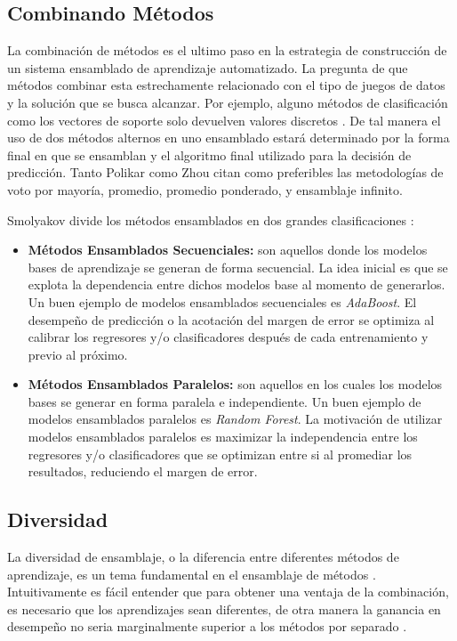 \subsection{Combinando Métodos}
La combinación de métodos es el ultimo paso en la estrategia de construcción de un sistema ensamblado de aprendizaje automatizado. La pregunta de que métodos combinar esta estrechamente relacionado con el tipo de juegos de datos y la solución que se busca alcanzar. Por ejemplo, alguno métodos de clasificación como los vectores de soporte solo devuelven valores discretos \cite{ensembleMachineLearning}. De tal manera el uso de dos métodos alternos en uno ensamblado estará determinado por la forma final en que se ensamblan y el algoritmo final utilizado para la decisión de predicción. Tanto Polikar \cite{ensembleMachineLearning} como Zhou \cite{ensembleMethods} citan como preferibles las metodologías de voto por mayoría, promedio, promedio ponderado, y ensamblaje infinito.

Smolyakov divide los métodos ensamblados en dos grandes clasificaciones \cite{smolyakov}:

\begin{itemize}
  \item \textbf{Métodos Ensamblados Secuenciales:} son aquellos donde los modelos bases de aprendizaje se generan de forma secuencial. La idea inicial es que se explota la dependencia entre dichos modelos base al momento de generarlos. Un buen ejemplo de modelos ensamblados secuenciales es \emph{AdaBoost}. El desempeño de predicción o la acotación del margen de error se optimiza al calibrar los regresores y/o clasificadores después de cada entrenamiento y previo al próximo.
  \item \textbf{Métodos Ensamblados Paralelos:} son aquellos en los cuales los modelos bases se generar en forma paralela e independiente. Un buen ejemplo de modelos ensamblados paralelos es \emph{Random Forest}. La motivación de utilizar modelos ensamblados paralelos es maximizar la independencia entre los regresores y/o clasificadores que se optimizan entre si al promediar los resultados, reduciendo el margen de error.
\end{itemize}


\subsection{Diversidad}
La diversidad de ensamblaje, o la diferencia entre diferentes métodos de aprendizaje, es un tema fundamental en el ensamblaje de métodos \cite{ensembleMethods}. Intuitivamente es fácil entender que para obtener una ventaja de la combinación, es necesario que los aprendizajes sean diferentes, de otra manera la ganancia en desempeño no seria marginalmente superior a los métodos por separado \cite{ensembleMethods}.

